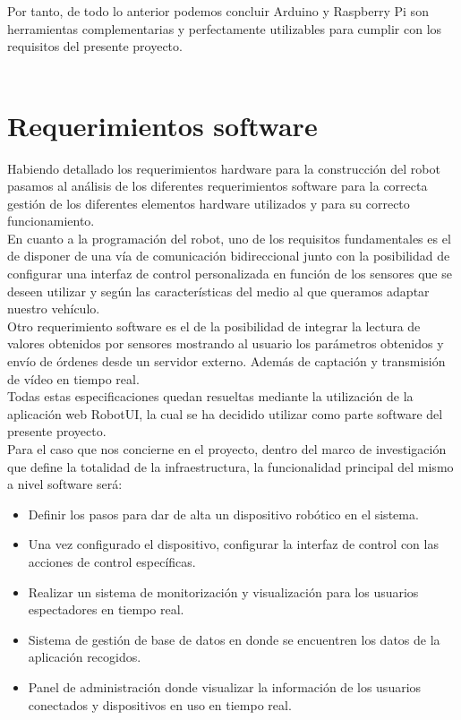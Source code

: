 Por tanto, de todo lo anterior podemos concluir Arduino y Raspberry Pi son herramientas complementarias y perfectamente utilizables para cumplir con los requisitos del presente proyecto.\\\\


\section{Requerimientos software}
\label{sec:requerimientos-software}

Habiendo detallado los requerimientos hardware para la construcción del robot pasamos al análisis de los diferentes requerimientos software para la correcta
gestión de los diferentes elementos hardware utilizados y para su correcto funcionamiento.\\

En cuanto a la programación del robot, uno de los requisitos fundamentales es el de disponer de una vía de comunicación bidireccional junto con la posibilidad de
configurar una interfaz de control personalizada en función de los sensores que se deseen utilizar y según las características del medio al que queramos adaptar nuestro vehículo.\\

Otro requerimiento software es el de la posibilidad de integrar la lectura de valores obtenidos por sensores mostrando al usuario los parámetros obtenidos y envío de órdenes
desde un servidor externo. Además de captación y transmisión de vídeo en tiempo real.\\

Todas estas especificaciones quedan resueltas mediante la utilización de la aplicación web RobotUI, la cual se ha decidido utilizar como parte software del presente proyecto.\\

Para el caso que nos concierne en el proyecto, dentro del marco de investigación que define la totalidad de la infraestructura, la funcionalidad principal del mismo a nivel 
software será:\\

\begin{itemize}
\item Definir los pasos para dar de alta un dispositivo robótico en el sistema.
\item Una vez configurado el dispositivo, configurar la interfaz de control con las acciones de control específicas.
\item Realizar un sistema de monitorización y visualización para los usuarios espectadores en tiempo real.
\item Sistema de gestión de base de datos en donde se encuentren los datos de la aplicación recogidos.
\item Panel de administración donde visualizar la información de los usuarios conectados y dispositivos en uso en tiempo real.
\end{itemize}

